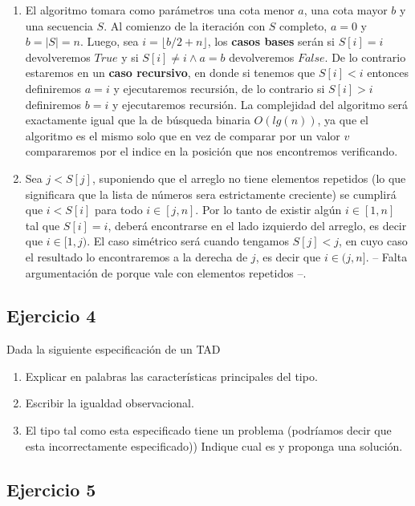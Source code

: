 \documentclass[10pt, a4paper]{article}
\begin{document}
\begin{enumerate}
 \item El algoritmo tomara como par\'ametros una cota menor $a$, una cota mayor $b$ y una secuencia $S$. Al comienzo de la iteraci\'on con $S$ completo, $a=0$ y $b=|S|=n$. Luego, sea $i = \lfloor b/2+n \rfloor$, los \textbf{casos bases} ser\'an si $S[i] = i$ devolveremos $True$ y si $S[i] \not= i \land a=b$ devolveremos $False$. De lo contrario estaremos en un \textbf{caso recursivo}, en donde si tenemos que $S[i] < i$ entonces definiremos $a=i$ y ejecutaremos recursi\'on, de lo contrario si $S[i] > i$ definiremos $b=i$ y ejecutaremos recursi\'on. La complejidad del algoritmo ser\'a exactamente igual que la de b\'usqueda binaria $O(lg(n))$, ya que el algoritmo es el mismo solo que en vez de comparar por un valor $v$ compararemos por el indice en la posici\'on que nos encontremos verificando.
 
 \item Sea $j < S[j]$, suponiendo que el arreglo no tiene elementos repetidos (lo que significara que la lista de n\'umeros sera estrictamente creciente) se cumplir\'a que $i < S[i]$ para todo $i \in [j,n]$. Por lo tanto de existir alg\'un $i \in [1,n]$ tal que $S[i]=i$, deber\'a encontrarse en el lado izquierdo del arreglo, es decir que $i \in [1,j)$. El caso sim\'etrico ser\'a cuando tengamos $S[j] < j$, en cuyo caso el resultado lo encontraremos a la derecha de $j$, es decir que $i \in (j,n]$. -- {\color{red}Falta argumentaci\'on de porque vale con elementos repetidos} --.
\end{enumerate}

\subsection*{Ejercicio 4}

Dada la siguiente especificaci\'on de un TAD
\begin{enumerate}
 \item Explicar en palabras las caracter\'isticas principales del tipo.
 \item Escribir la igualdad observacional.
 \item El tipo tal como esta especificado tiene un problema (podr\'iamos decir que esta incorrectamente especificado)) Indique cual es y proponga una soluci\'on.
\end{enumerate}

\subsection*{Ejercicio 5}
\end{document}
